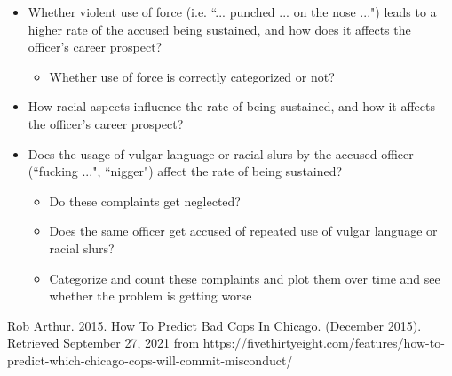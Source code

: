 \documentclass[12pt]{article}
\begin{document}
\begin{itemize}

\item Whether violent use of force (i.e. ``... punched ... on the nose ...") leads to a higher rate of the accused being sustained, and how does it affects the officer’s career prospect?

\begin{itemize}

\item Whether use of force is correctly categorized or not?

\end{itemize}

\item How racial aspects influence the rate of being sustained, and how it affects the officer’s career prospect?

\item Does the usage of vulgar language or racial slurs by the accused officer (``fucking ...", ``nigger") affect the rate of being sustained?

\begin{itemize}

\item Do these complaints get neglected?

\item Does the same officer get accused of repeated use of vulgar language or racial slurs?

\item Categorize and count these complaints and plot them over time and see whether the problem is getting worse

\end{itemize}

\end{itemize}


\begin{thebibliography}{9}

Rob Arthur. 2015. How To Predict Bad Cops In Chicago. (December 2015). Retrieved September 27, 2021 from https://fivethirtyeight.com/features/how-to-predict-which-chicago-cops-will-commit-misconduct/

\end{thebibliography}
\end{document}
